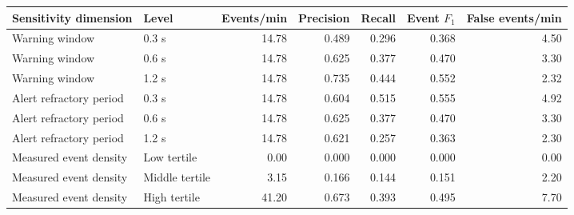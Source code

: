 \begin{tabular}{llrrrrr}
\toprule
Sensitivity dimension & Level & Events/min & Precision & Recall & Event $F_1$ & False events/min \\
\midrule
Warning window & 0.3 s & 14.78 & 0.489 & 0.296 & 0.368 & 4.50 \\
Warning window & 0.6 s & 14.78 & 0.625 & 0.377 & 0.470 & 3.30 \\
Warning window & 1.2 s & 14.78 & 0.735 & 0.444 & 0.552 & 2.32 \\
Alert refractory period & 0.3 s & 14.78 & 0.604 & 0.515 & 0.555 & 4.92 \\
Alert refractory period & 0.6 s & 14.78 & 0.625 & 0.377 & 0.470 & 3.30 \\
Alert refractory period & 1.2 s & 14.78 & 0.621 & 0.257 & 0.363 & 2.30 \\
Measured event density & Low tertile & 0.00 & 0.000 & 0.000 & 0.000 & 0.00 \\
Measured event density & Middle tertile & 3.15 & 0.166 & 0.144 & 0.151 & 2.20 \\
Measured event density & High tertile & 41.20 & 0.673 & 0.393 & 0.495 & 7.70 \\
\bottomrule
\end{tabular}
